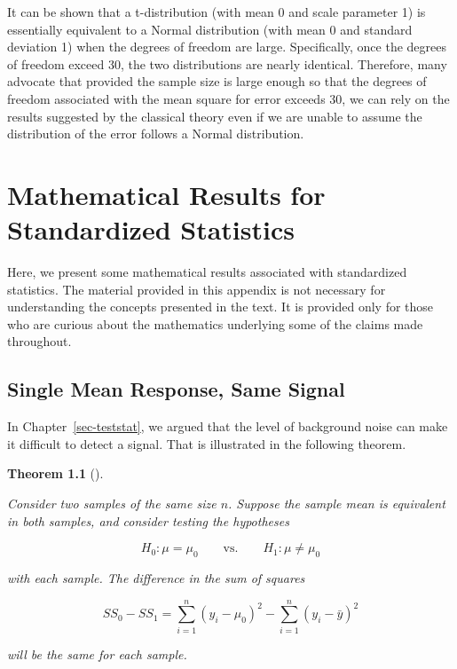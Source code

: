 \documentclass[
  letterpaper,
  DIV=11,
  numbers=noendperiod]{scrreprt}
\theoremstyle{plain}
\newtheorem{theorem}{Theorem}[chapter]
\theoremstyle{definition}
\theoremstyle{definition}
\theoremstyle{remark}
\begin{document}
It can be shown that a t-distribution (with mean 0 and scale parameter
1) is essentially equivalent to a Normal distribution (with mean 0 and
standard deviation 1) when the degrees of freedom are large.
Specifically, once the degrees of freedom exceed 30, the two
distributions are nearly identical. Therefore, many advocate that
provided the sample size is large enough so that the degrees of freedom
associated with the mean square for error exceeds 30, we can rely on the
results suggested by the classical theory even if we are unable to
assume the distribution of the error follows a Normal distribution.

\hypertarget{sec-app-teststat}{%
\chapter{Mathematical Results for Standardized
Statistics}\label{sec-app-teststat}}

Here, we present some mathematical results associated with standardized
statistics. The material provided in this appendix is not necessary for
understanding the concepts presented in the text. It is provided only
for those who are curious about the mathematics underlying some of the
claims made throughout.

\hypertarget{single-mean-response-same-signal}{%
\section{Single Mean Response, Same
Signal}\label{single-mean-response-same-signal}}

In Chapter~\ref{sec-teststat}, we argued that the level of background
noise can make it difficult to detect a signal. That is illustrated in
the following theorem.

\begin{theorem}[]\protect\hypertarget{thm-app-teststat-same-signal}{}\label{thm-app-teststat-same-signal}

Consider two samples of the same size \(n\). Suppose the sample mean is
equivalent in both samples, and consider testing the hypotheses

\[H_0: \mu = \mu_0 \qquad \text{vs.} \qquad H_1: \mu \neq \mu_0\]

with each sample. The difference in the sum of squares

\[SS_0 - SS_1 = \sum_{i=1}^{n} \left(y_i - \mu_0\right)^2 - \sum_{i=1}^{n} \left(y_i - \bar{y}\right)^2\]

will be the same for each sample.

\end{theorem}
\end{document}
